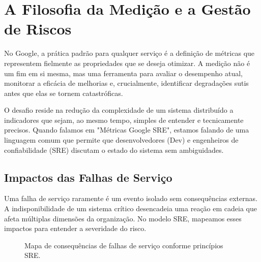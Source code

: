 \documentclass[12pt,a4paper,twoside]{report}
\begin{document}
\section{A Filosofia da Medição e a Gestão de Riscos}

No Google, a prática padrão para qualquer serviço é a definição de métricas que representem fielmente as propriedades que se deseja otimizar. A medição não é um fim em si mesma, mas uma ferramenta para avaliar o desempenho atual, monitorar a eficácia de melhorias e, crucialmente, identificar degradações sutis antes que elas se tornem catastróficas.

O desafio reside na redução da complexidade de um sistema distribuído a indicadores que sejam, ao mesmo tempo, simples de entender e tecnicamente precisos. Quando falamos em "Métricas Google SRE", estamos falando de uma linguagem comum que permite que desenvolvedores (Dev) e engenheiros de confiabilidade (SRE) discutam o estado do sistema sem ambiguidades.

\subsection{Impactos das Falhas de Serviço}

Uma falha de serviço raramente é um evento isolado sem consequências externas. A indisponibilidade de um sistema crítico desencadeia uma reação em cadeia que afeta múltiplas dimensões da organização. No modelo SRE, mapeamos esses impactos para entender a severidade do risco.

\begin{figure}[h]
    \centering
    \caption{Mapa de consequências de falhas de serviço conforme princípios SRE.}
\end{figure}
\end{document}
